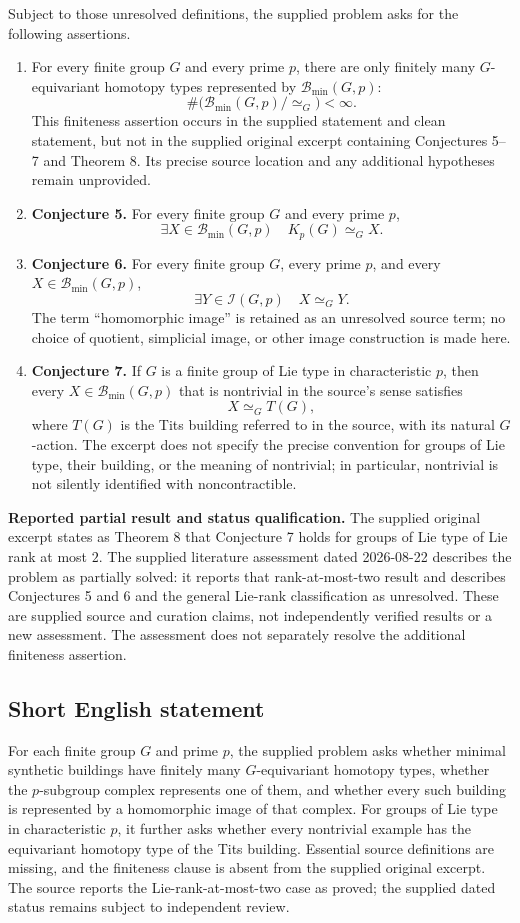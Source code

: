 \documentclass[11pt]{article}
\begin{document}
Subject to those unresolved definitions, the supplied problem asks for the following assertions.
\begin{enumerate}
\item For every finite group \(G\) and every prime \(p\), there are only finitely many \(G\)-equivariant homotopy types represented by \(\mathscr B_{\min}(G,p)\):
\[
\#\bigl(\mathscr B_{\min}(G,p)/{\simeq_G}\bigr)<\infty.
\]
This finiteness assertion occurs in the supplied statement and clean statement, but not in the supplied original excerpt containing Conjectures 5--7 and Theorem 8. Its precise source location and any additional hypotheses remain unprovided.
\item \textbf{Conjecture 5.} For every finite group \(G\) and every prime \(p\),
\[
\exists X\in\mathscr B_{\min}(G,p)\quad K_p(G)\simeq_G X.
\]
\item \textbf{Conjecture 6.} For every finite group \(G\), every prime \(p\), and every \(X\in\mathscr B_{\min}(G,p)\),
\[
\exists Y\in\mathscr I(G,p)\quad X\simeq_G Y.
\]
The term ``homomorphic image'' is retained as an unresolved source term; no choice of quotient, simplicial image, or other image construction is made here.
\item \textbf{Conjecture 7.} If \(G\) is a finite group of Lie type in characteristic \(p\), then every \(X\in\mathscr B_{\min}(G,p)\) that is nontrivial in the source's sense satisfies
\[
X\simeq_G T(G),
\]
where \(T(G)\) is the Tits building referred to in the source, with its natural \(G\)-action. The excerpt does not specify the precise convention for groups of Lie type, their building, or the meaning of nontrivial; in particular, nontrivial is not silently identified with noncontractible.
\end{enumerate}

\textbf{Reported partial result and status qualification.} The supplied original excerpt states as Theorem 8 that Conjecture 7 holds for groups of Lie type of Lie rank at most \(2\). The supplied literature assessment dated 2026-08-22 describes the problem as partially solved: it reports that rank-at-most-two result and describes Conjectures 5 and 6 and the general Lie-rank classification as unresolved. These are supplied source and curation claims, not independently verified results or a new assessment. The assessment does not separately resolve the additional finiteness assertion.
\subsection{Short English statement}
For each finite group \(G\) and prime \(p\), the supplied problem asks whether minimal synthetic buildings have finitely many \(G\)-equivariant homotopy types, whether the \(p\)-subgroup complex represents one of them, and whether every such building is represented by a homomorphic image of that complex. For groups of Lie type in characteristic \(p\), it further asks whether every nontrivial example has the equivariant homotopy type of the Tits building. Essential source definitions are missing, and the finiteness clause is absent from the supplied original excerpt. The source reports the Lie-rank-at-most-two case as proved; the supplied dated status remains subject to independent review.
\end{document}
